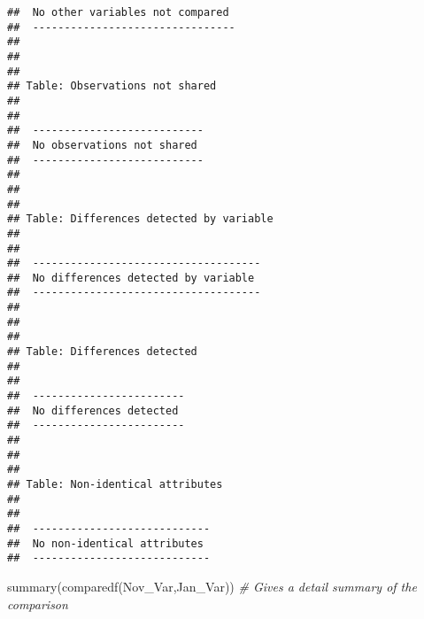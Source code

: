 \documentclass[
]{article}
\newenvironment{Shaded}{\begin{snugshade}}{\end{snugshade}}
\newcommand{\CommentTok}[1]{\textcolor[rgb]{0.56,0.35,0.01}{\textit{#1}}}
\newcommand{\FunctionTok}[1]{\textcolor[rgb]{0.00,0.00,0.00}{#1}}
\newcommand{\NormalTok}[1]{#1}
\begin{document}
\begin{verbatim}
##  No other variables not compared 
##  --------------------------------
## 
## 
## 
## Table: Observations not shared
## 
##                             
##  ---------------------------
##  No observations not shared 
##  ---------------------------
## 
## 
## 
## Table: Differences detected by variable
## 
##                                      
##  ------------------------------------
##  No differences detected by variable 
##  ------------------------------------
## 
## 
## 
## Table: Differences detected
## 
##                          
##  ------------------------
##  No differences detected 
##  ------------------------
## 
## 
## 
## Table: Non-identical attributes
## 
##                              
##  ----------------------------
##  No non-identical attributes 
##  ----------------------------
\end{verbatim}

\begin{Shaded}
\begin{Highlighting}[]
 \FunctionTok{summary}\NormalTok{(}\FunctionTok{comparedf}\NormalTok{(Nov\_Var,Jan\_Var)) }\CommentTok{\# Gives a detail summary of the comparison}
\end{Highlighting}
\end{Shaded}
\end{document}

